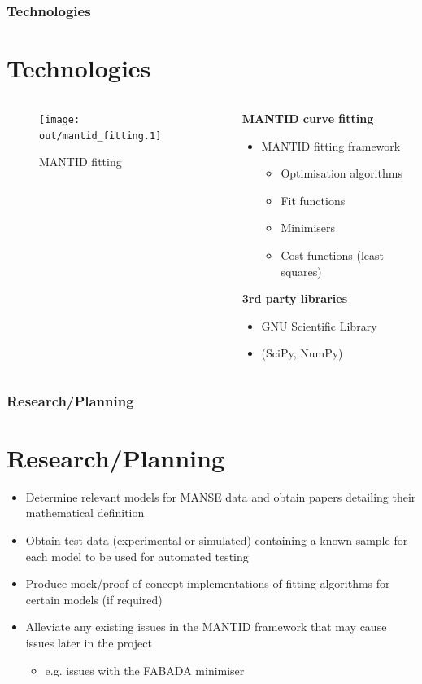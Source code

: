 \documentclass[10pt,serif,t]{beamer}
\newcommand\Heading[1]{%
  {\bfseries#1}\par\smallskip}
\newenvironment{Slide}[1]
{
\begin{frame}[fragile,environment=Slide]
  \frametitle{#1}
  \section{#1}
}
{
\end{frame}
}
\begin{document}
\begin{Slide}{Technologies}
  \begin{columns}[T]
    \begin{column}{.55\textwidth}
      \begin{figure}[h!]
        \centering
        \texttt{[image: out/mantid\_fitting.1]}
        \caption{MANTID fitting}
        \label{fig:fitting_workflow}
      \end{figure}
    \end{column}
    \hfill
    \begin{column}{.44\textwidth}
      \Heading{MANTID curve fitting}
      \begin{itemize}
        \item MANTID fitting framework
          \begin{itemize}
            \item Optimisation algorithms
            \item Fit functions
            \item Minimisers
            \item Cost functions (least squares)
          \end{itemize}
      \end{itemize}
      \Heading{3rd party libraries}
      \begin{itemize}
        \item GNU Scientific Library
        \item (SciPy, NumPy)
      \end{itemize}
    \end{column}
  \end{columns}
\end{Slide}

\begin{Slide}{Research/Planning}
  \begin{itemize}
    \item Determine relevant models for MANSE data and obtain papers detailing
          their mathematical definition
          \smallskip
    \item Obtain test data (experimental or simulated) containing a known sample
          for each model to be used for automated testing
          \smallskip
    \item Produce mock/proof of concept implementations of fitting algorithms
          for certain models (if required)
          \smallskip
    \item Alleviate any existing issues in the MANTID framework that may cause
          issues later in the project
          \smallskip
          \begin{itemize}
            \item e.g. issues with the FABADA minimiser
          \end{itemize}
  \end{itemize}
\end{Slide}
\end{document}
